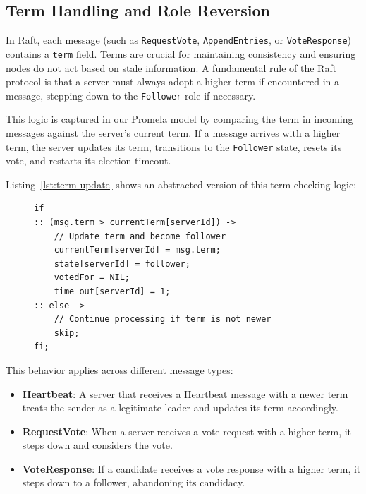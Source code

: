 \documentclass[a4paper]{llncs}
\begin{document}
\subsection{Term Handling and Role Reversion}
\label{sec:term_handling}

In Raft, each message (such as \texttt{RequestVote}, \texttt{AppendEntries}, or \texttt{VoteResponse}) contains a \texttt{term} field. Terms are crucial for maintaining consistency and ensuring nodes do not act based on stale information. A fundamental rule of the Raft protocol is that a server must always adopt a higher term if encountered in a message, stepping down to the \texttt{Follower} role if necessary.

This logic is captured in our Promela model by comparing the term in incoming messages against the server's current term. If a message arrives with a higher term, the server updates its term, transitions to the \texttt{Follower} state, resets its vote, and restarts its election timeout.

Listing~\ref{lst:term-update} shows an abstracted version of this term-checking logic:

\begin{figure}[htbp]
    \centering
    \begin{lstlisting}[style=promela, caption={Generic term update mechanism for incoming messages}, label={lst:term-update}]
if
:: (msg.term > currentTerm[serverId]) ->
    // Update term and become follower
    currentTerm[serverId] = msg.term;
    state[serverId] = follower;
    votedFor = NIL;
    time_out[serverId] = 1;
:: else ->
    // Continue processing if term is not newer
    skip;
fi;
    \end{lstlisting}
\end{figure}

This behavior applies across different message types:
\begin{itemize}
    \item \textbf{Heartbeat}: A server that receives a Heartbeat message with a newer term treats the sender as a legitimate leader and updates its term accordingly.
    \item \textbf{RequestVote}: When a server receives a vote request with a higher term, it steps down and considers the vote.
    \item \textbf{VoteResponse}: If a candidate receives a vote response with a higher term, it steps down to a follower, abandoning its candidacy.
\end{itemize}
\end{document}
